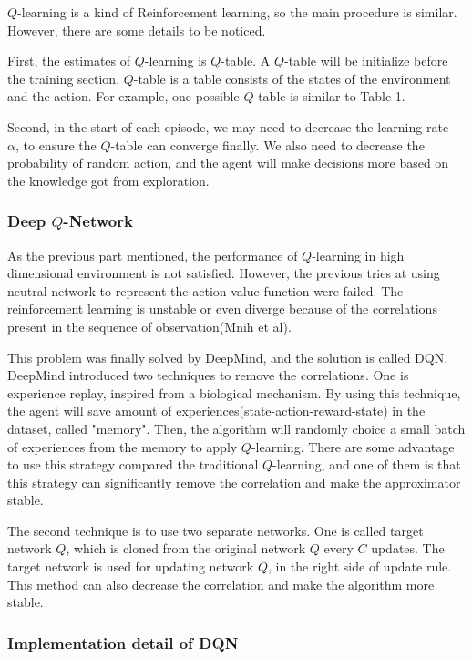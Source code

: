 \documentclass[14pt]{extarticle}
\begin{document}
$Q$-learning is a kind of Reinforcement learning, so the main procedure is similar. However, there are some details to be noticed. 

First, the estimates of $Q$-learning is $Q$-table. A $Q$-table will be initialize before the training section. $Q$-table is a table consists of the states of the environment and the action. For example, one possible $Q$-table is similar to Table 1.

Second, in the start of each episode, we may need to decrease the learning rate - $\alpha$, to ensure the $Q$-table can converge finally. We also need to decrease the probability of random action, and the agent will make decisions more based on the knowledge got from exploration.

\subsubsection{Deep $Q$-Network} 

As the previous part mentioned, the performance of $Q$-learning in high dimensional environment is not satisfied. However, the previous tries at using neutral network to represent the action-value function were failed. The reinforcement learning is unstable or even diverge because of the correlations present in the sequence of observation(Mnih et al). 

This problem was finally solved by DeepMind, and the solution is called DQN. DeepMind introduced two techniques to remove the correlations. One is experience replay, inspired from a biological mechanism. By using this technique, the agent will save amount of experiences(state-action-reward-state) in the dataset, called "memory". Then, the algorithm will randomly choice a small batch of experiences from the memory to apply $Q$-learning. There are some advantage to use this strategy compared the traditional $Q$-learning, and one of them is that this strategy can significantly remove the correlation and make the approximator stable.

The second technique is to use two separate networks. One is called target network $Q$, which is cloned from the original network $Q$ every $C$ updates. The target network is used for updating network $Q$, in the right side of update rule. This method can also decrease the correlation and make the algorithm more stable.

\subsubsection*{\small Implementation detail of DQN}
\end{document}
